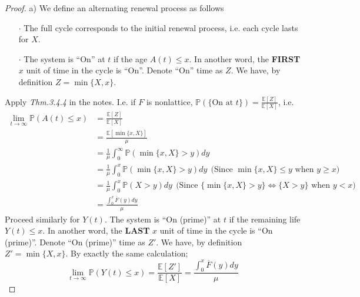 \documentclass[a4paper, 10pt]{article}
\theoremstyle{definition}
\theoremstyle{hSol}
\begin{document}
\begin{proof} a) We define an alternating renewal process as follows
\begin{itemize}
   \item[$\cdot$] The full cycle corresponds to the initial renewal process, i.e. each cycle lasts for $X$. 
   \item[$\cdot$] The system is ``On'' at $t$ if the age $A(t)\leq x$. In another word, the \textbf{FIRST} $x$ unit of time in the cycle is ``On''. Denote ``On'' time as $Z$. We have, by definition $Z=\min\{X,x\}$.
 \end{itemize} 
 Apply \textit{Thm.3.4.4} in the notes. I.e. if $F$ is nonlattice, $\mathbb{P}\left(\{\text{On at }t\}\right)=\frac{\mathbb{E}\left[Z\right]}{\mathbb{E}\left[X\right]}$, i.e.
 \begin{equation}
  \begin{split}
    \lim\limits_{t\rightarrow\infty}\mathbb{P}\left(A(t)\leq x\right) &= \frac{\mathbb{E}\left[Z\right]}{\mathbb{E}\left[X\right]} \\
    &= \frac{\mathbb{E}\left[\min\{x,X\}\right]}{\mu} \\
    &= \frac{1}{\mu}\int_{0}^{\infty}\mathbb{P}\left(\min\{x,X\}>y\right)dy \\
    &= \frac{1}{\mu}\int_{0}^{x} \mathbb{P}\left(\min\{x,X\}>y\right)dy~~\text{(Since $\min\{x,X\} \leq y$ when $y\geq x$)} \\
    &= \frac{1}{\mu}\int_{0}^{x} \mathbb{P}\left(X>y\right)dy~~\text{(Since $\{\min\{x,X\}>y\}\iff\{X>y\}$ when $y<x$)} \\
    &= \frac{\int_0^x \overline{F}(y)dy}{\mu}
  \end{split}
 \end{equation}
 Proceed similarly for $Y(t)$. The system is ``On (prime)'' at $t$ if the remaining life $Y(t)\leq x$. In another word, the \textbf{LAST} $x$ unit of time in the cycle is ``On (prime)''. Denote ``On (prime)'' time as $Z'$. We have, by definition $Z'=\min\{X,x\}$. By exactly the same calculation;
 \begin{equation}
   \lim\limits_{t\rightarrow\infty}\mathbb{P}\left(Y(t)\leq x\right) = \frac{\mathbb{E}\left[Z'\right]}{\mathbb{E}\left[X\right]} = \frac{\int_0^x \overline{F}(y)dy}{\mu}
 \end{equation}
\end{proof}
\end{document}
